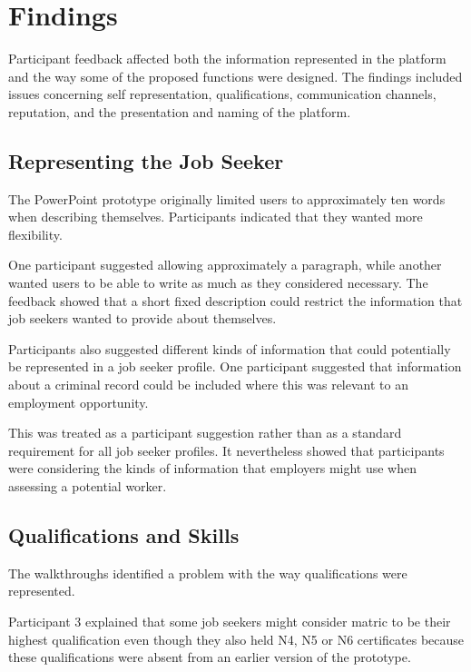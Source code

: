 \section{Findings}

Participant feedback affected both the information represented in the platform and the way some of the proposed functions were designed. The findings included issues concerning self representation, qualifications, communication channels, reputation, and the presentation and naming of the platform.


\subsection{Representing the Job Seeker}

The PowerPoint prototype originally limited users to approximately ten words when describing themselves. Participants indicated that they wanted more flexibility.

One participant suggested allowing approximately a paragraph, while another wanted users to be able to write as much as they considered necessary. The feedback showed that a short fixed description could restrict the information that job seekers wanted to provide about themselves.

Participants also suggested different kinds of information that could potentially be represented in a job seeker profile. One participant suggested that information about a criminal record could be included where this was relevant to an employment opportunity.

This was treated as a participant suggestion rather than as a standard requirement for all job seeker profiles. It nevertheless showed that participants were considering the kinds of information that employers might use when assessing a potential worker.


\subsection{Qualifications and Skills}

The walkthroughs identified a problem with the way qualifications were represented.

Participant 3 explained that some job seekers might consider matric to be their highest qualification even though they also held N4, N5 or N6 certificates because these qualifications were absent from an earlier version of the prototype.


